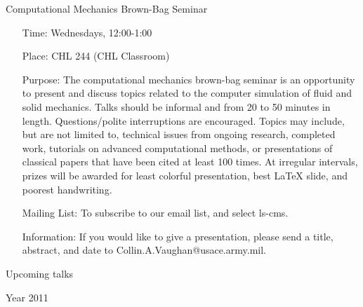 \documentclass[12]{article}
\begin{document}
\begin{center}
\Large
Computational Mechanics Brown-Bag Seminar
\end{center}

\begin{itemize}
\item[Time:] Wednesdays, 12:00-1:00

\item[Place:] CHL 244 (CHL Classroom)

\item[Purpose:] The computational mechanics brown-bag seminar is an
  opportunity to present and discuss topics related to the computer
  simulation of fluid and solid mechanics. Talks should be informal
  and from 20 to 50 minutes in length. Questions/polite interruptions
  are encouraged. Topics may include, but are not limited to,
  technical issues from ongoing research, completed work, tutorials on
  advanced computational methods, or presentations of classical papers
  that have been cited at least 100 times.  At irregular intervals,
  prizes will be awarded for least colorful presentation, best \LaTeX
  slide, and poorest handwriting.

\item[Mailing List:] To subscribe to our email list,
  and select ls-cms.

\item[Information:] If you would like to give a presentation, please send a title, abstract, and date to Collin.A.Vaughan@usace.army.mil.


\end{itemize}


\begin{center}
\Large
Upcoming talks
\end{center}

\begin{center}
\Large
Year 2011
\end{center}
\end{document}
